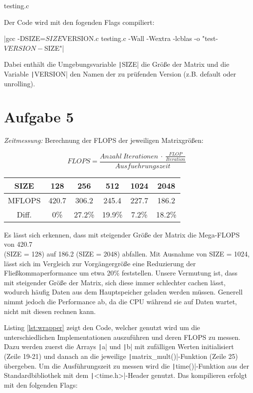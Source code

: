 \documentclass[a4paper]{article}
\begin{document}
\begin{listing}[H]
\inputminted[firstline=5, linenos=true]{c}{testing.c}
\caption{testing.c}
\label{lst:testing}
\end{listing}

Der Code wird mit den fogenden Flags compiliert: 

|gcc -DSIZE=${SIZE} ${VERSION}.c testing.c -Wall -Wextra -lcblas -o "test-${VERSION}-${SIZE}"|

Dabei enthält die Umgebungsvariable \texttt|SIZE| die Größe der Matrix und die Variable \texttt|VERSION| den Namen der zu prüfenden Version (z.B. default oder unrolling).

\section*{Aufgabe 5}

\textit{Zeitmessung:}
Berechnung der FLOPS der jeweiligen Matrixgrößen:

\begin{equation*}
FLOPS = \frac{Anzahl~Iterationen~\cdot~\frac{FLOP}{Iteration}}{Ausfuehrungszeit}
\end{equation*}

\begin{table}[h!]
 \begin{tabular}{c|c c c c c} 
 SIZE & 128 & 256 & 512 & 1024 & 2048 \\ [0.5ex] 
 \hline\hline
 MFLOPS& 420.7& 306.2& 245.4& 227.7& 186.2 \\ [1ex]
 Diff.& 0\%& 27.2\%& 19.9\%& 7.2\%& 18.2\% \\ [1ex]
 \end{tabular}
\end{table}

Es lässt sich erkennen, dass mit steigender Größe der Matrix die Mega-FLOPS von 420.7 \\ (SIZE = 128) auf 186.2 (SIZE = 2048) abfallen. Mit Ausnahme von SIZE = 1024, lässt sich im Vergleich zur Vorgängergröße eine Reduzierung der Fließkommaperformance um etwa 20\% feststellen. Unsere Vermutung ist, dass mit steigender Größe der Matrix, sich diese immer schlechter cachen lässt, wodurch häufig Daten aus dem Hauptspeicher geladen werden müssen. Generell nimmt jedoch die Performance ab, da die CPU während sie auf Daten wartet, nicht mit diesen rechnen kann.

Listing \ref{lst:wrapper} zeigt den Code, welcher genutzt wird um die unterschiedlichen Implementationen auszuführen und deren FLOPS zu messen. Dazu werden zuerst die Arrays \texttt|a| und \texttt|b| mit zufälligen Werten initialisiert (Zeile 19-21) und danach an die jeweilige \texttt|matrix_mult()|-Funktion (Zeile 25) übergeben. Um die Ausführungszeit zu messen wird die \texttt|time()|-Funktion aus der Standardbibliothek mit dem \texttt|<time.h>|-Header genutzt. Das kompilieren erfolgt mit den folgenden Flags:
\end{document}
